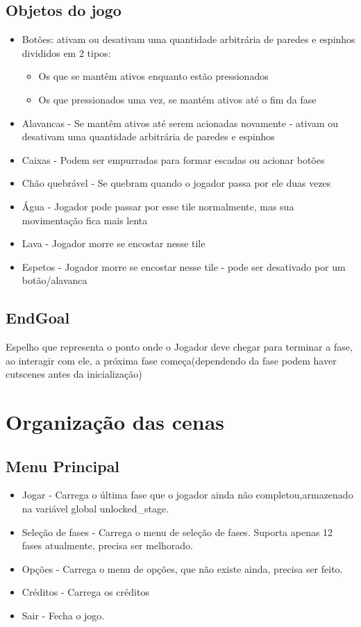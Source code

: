 \documentclass[a4paper, 11pt]{article}
\begin{document}
	\subsection{Objetos do jogo} 
		\begin{itemize} 
			\item Botões: ativam ou desativam uma quantidade arbitrária de paredes e espinhos divididos em 2 tipos: 
			\begin{itemize}
			        \item Os que se mantêm ativos enquanto estão pressionados
			        \item Os que pressionados uma vez, se mantém ativos até o fim da fase
			\end{itemize}   
			\item Alavancas - Se mantêm ativos até serem acionadas novamente - ativam ou desativam uma quantidade arbitrária de paredes e espinhos 
			\item Caixas - Podem ser empurradas para formar escadas ou acionar botões 
			\item Chão quebrável - Se quebram quando o jogador passa por ele duas vezes 
			\item Água - Jogador pode passar por esse tile normalmente, mas sua movimentação fica mais lenta 
			\item Lava - Jogador morre se encostar nesse tile 
			\item Espetos - Jogador morre se encostar nesse tile - pode ser desativado por um botão/alavanca 
		\end{itemize} 
 		\subsection{EndGoal}
 			Espelho que representa o ponto onde o Jogador deve chegar para terminar a fase, ao interagir com ele, a próxima fase começa(dependendo da fase podem haver cutscenes antes da inicialização)
	
\section{Organização das cenas} 
		\subsection{Menu Principal} 
			\begin{itemize} 
				\item Jogar - Carrega o última fase que o jogador ainda não completou,armazenado na variável global unlocked\_stage. 
				\item Seleção de fases - Carrega o menu de seleção de fases. Suporta apenas 12 fases atualmente, precisa ser melhorado.
				\item Opções - Carrega o menu de opções, que não existe ainda, precisa ser feito. 
				\item Créditos - Carrega os créditos 
				\item Sair - Fecha o jogo.
			\end{itemize} 
 
\end{document}
